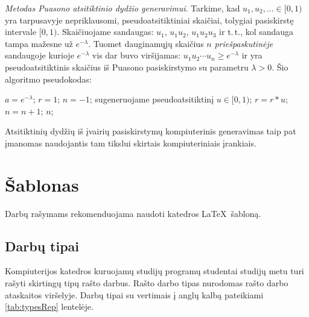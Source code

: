 \documentclass[a4paper,12pt]{article}
\begin{document}
\emph{Metodas Puasono atsitiktinio dydžio generavimui}.
Tarkime, kad $u_1, u_2, \ldots \in [0,1)$ yra tarpusavyje nepriklausomi, pseudoatsitiktiniai skaičiai, tolygiai pasiskirstę intervale $[0,1)$.
Skaičiuojame sandaugas: $u_1$, $u_1 u_2$, $u_1 u_2 u_3$ ir t.\,t., kol sandauga tampa mažesne už $e^{-\lambda}$.
Tuomet dauginamųjų skaičius $n$ \emph{priešpaskutinėje} sandaugoje kurioje $e^{-\lambda}$ vis dar buvo viršijamas: $u_1 u_2 \cdots u_n \geqslant e^{-\lambda}$
ir yra pseudoatsitiktinis skaičius iš Puasono pasiskirstymo su parametru $\lambda>0$. Šio algoritmo pseudokodas:

\bigskip
\begin{minipage}[v]{0.9\textwidth}
    \begin{algorithmic}
        \STATE $a = e^{-\lambda}$;
        \STATE $r = 1$;
        \STATE $n = -1$;
        \hspace{10mm}
            \STATE sugeneruojame pseudoatsitiktinį $u \in [0,1)$;
            \STATE $r = r * u$;
            \STATE $n = n + 1$;
        \ENDWHILE
        \RETURN $n$;
    \end{algorithmic}
\end{minipage}
\bigskip

Atsitiktinių dydžių iš įvairių pasiskirstymų kompiuterinis generavimas taip pat įmanomas naudojantis tam tikslui skirtais kompiuteriniais įrankiais.

\newpage
\section{Šablonas}
\label{sec:template}
Darbų rašymams rekomenduojama naudoti katedros \LaTeX\ šabloną.




\subsection{Darbų tipai}
Kompiuterijos katedros kuruojamų studijų programų studentai studijų
metu turi rašyti skirtingų tipų rašto darbus. Rašto darbo tipas
nurodomas rašto darbo ataskaitos viršelyje. Darbų tipai su vertimais į
anglų kalbą pateikiami \ref{tab:typesRep} lentelėje.
\end{document}
